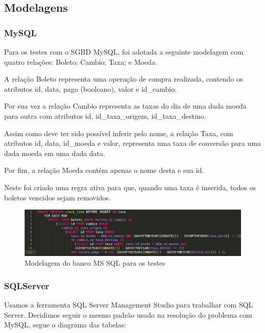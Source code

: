 \documentclass[conference]{IEEEtran}
\begin{document}
  \subsection{Modelagens}
    \subsubsection{MySQL}
    Para os testes com o SGBD MySQL, foi adotada a seguinte modelagem com quatro relações: Boleto; Cambio; Taxa; e Moeda.

    A relação Boleto representa uma operação de compra realizada, contendo os atributos id, data, pago (booleano), valor e id\_cambio.

    Por sua vez a relação Cambio representa as taxas do dia de uma dada moeda para outra com atributos id, id\_taxa\_origem, id\_taxa\_destino.

    Assim como deve ter sido possível inferir pelo nome, a relação Taxa, com atributos id, data, id\_moeda e valor, representa uma taxa de conversão para uma dada moeda em uma dada data.

    Por fim, a relação Moeda contém apenas o nome desta e sua id.

    Neste foi criado uma regra ativa para que, quando uma taxa é inserida, todos os boletos vencidos sejam removidos.

    \begin{figure}[!t]
      \centering
      \includegraphics[scale=0.40]{img/trigger-mysql.png}
      \caption{Modelagem do banco MS SQL para os testes}
    \end{figure}

    \subsubsection{SQLServer}
  	Usamos a ferramenta SQL Server Management Studio para trabalhar com SQL Server.			
  	Decidimos seguir o mesmo padrão usado na resolução do problema com MySQL, segue o diagrama das tabelas:
   
\end{document}
